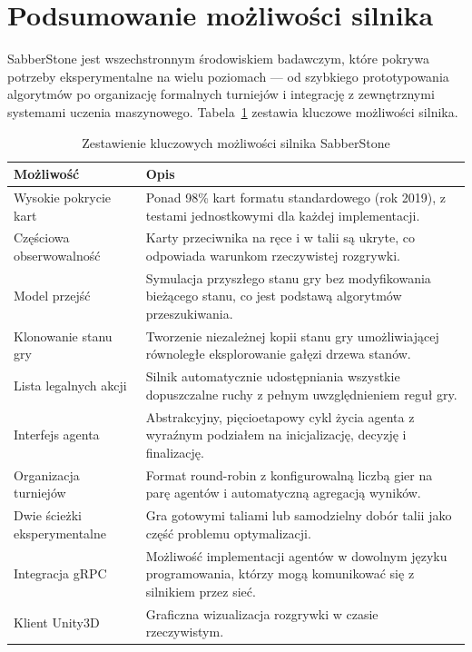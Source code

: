 \section{Podsumowanie możliwości silnika}

SabberStone jest wszechstronnym środowiskiem badawczym, które pokrywa potrzeby eksperymentalne na wielu poziomach --- od szybkiego prototypowania algorytmów po organizację formalnych turniejów i integrację z zewnętrznymi systemami uczenia maszynowego. Tabela~\ref{tab:sabber_summary} zestawia kluczowe możliwości silnika.

\begin{table}[ht]
\centering
\caption{Zestawienie kluczowych możliwości silnika SabberStone}
\label{tab:sabber_summary}
\begin{tabular}{p{5.2cm}p{8.3cm}}
\toprule
\textbf{Możliwość} & \textbf{Opis} \\
\midrule
Wysokie pokrycie kart
  & Ponad 98\% kart formatu standardowego (rok 2019), z testami jednostkowymi dla każdej implementacji. \\[4pt]
Częściowa obserwowalność
  & Karty przeciwnika na ręce i w talii są ukryte, co odpowiada warunkom rzeczywistej rozgrywki. \\[4pt]
Model przejść
  & Symulacja przyszłego stanu gry bez modyfikowania bieżącego stanu, co jest podstawą algorytmów przeszukiwania. \\[4pt]
Klonowanie stanu gry
  & Tworzenie niezależnej kopii stanu gry umożliwiającej równoległe eksplorowanie gałęzi drzewa stanów. \\[4pt]
Lista legalnych akcji
  & Silnik automatycznie udostępniania wszystkie dopuszczalne ruchy z pełnym uwzględnieniem reguł gry. \\[4pt]
Interfejs agenta
  & Abstrakcyjny, pięcioetapowy cykl życia agenta z wyraźnym podziałem na inicjalizację, decyzję i finalizację. \\[4pt]
Organizacja turniejów
  & Format round-robin z konfigurowalną liczbą gier na parę agentów i automatyczną agregacją wyników. \\[4pt]
Dwie ścieżki eksperymentalne
  & Gra gotowymi taliami lub samodzielny dobór talii jako część problemu optymalizacji. \\[4pt]
Integracja gRPC
  & Możliwość implementacji agentów w dowolnym języku programowania, którzy mogą komunikować się z silnikiem przez sieć. \\[4pt]
Klient Unity3D
  & Graficzna wizualizacja rozgrywki w czasie rzeczywistym. \\[4pt]

\bottomrule
\end{tabular}
\end{table}
